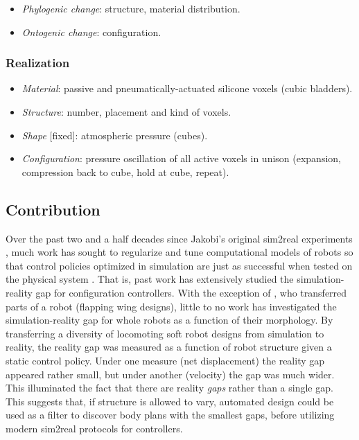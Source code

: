 \begin{itemize}
    \item \textit{Phylogenic change}: structure, material distribution.
    \item \textit{Ontogenic change}: configuration.
\end{itemize}

\subsubsection*{Realization}

\begin{itemize}
    \item \textit{Material}: passive and pneumatically-actuated silicone voxels (cubic bladders).
    \item \textit{Structure}: number, placement and kind of voxels.
    \item \textit{Shape} [fixed]: atmospheric pressure (cubes).
    \item \textit{Configuration}: pressure oscillation of all active voxels in unison (expansion, compression back to cube, hold at cube, repeat).
\end{itemize}



\subsection{Contribution}


Over the past two and a half decades since Jakobi's original sim2real experiments \cite{jakobi1995noise},
much work has sought to regularize and tune computational models of robots
so that control policies optimized in simulation are just as successful when tested on the physical system \cite{bongard2006resilient,koos2012transferability,cully2015robots,tan2018sim,pmlr-v87-golemo18a,tobin2018domain,chebotar2019closing,hwangbo2019learning,kwiatkowski2019task,nachum2019multi,akkaya2019solving}.
That is, past work has extensively studied the simulation-reality gap for configuration controllers.
With the exception of \citet{rosser2019sim2real}, who transferred parts of a robot (flapping wing designs),
little to no work has investigated the simulation-reality gap for whole robots as a function of their morphology.
By transferring a diversity of locomoting soft robot designs from simulation to reality, the reality gap was measured as a function of robot structure given a static control policy.
Under one measure (net displacement) the reality gap appeared rather small, but under another (velocity) the gap was much wider.
This illuminated the fact that there are reality \textit{gaps} rather than a single gap.
This suggests that, if structure is allowed to vary, automated design could be used as a filter to discover body plans with the smallest gaps, before utilizing modern sim2real protocols for controllers.

